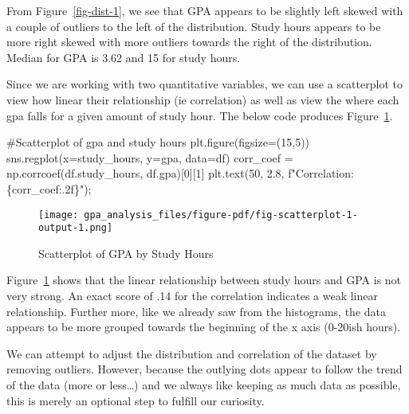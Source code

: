 \documentclass[
  letterpaper,
  DIV=11,
  numbers=noendperiod]{scrreprt}
\newenvironment{Shaded}{\begin{snugshade}}{\end{snugshade}}
\newcommand{\CommentTok}[1]{\textcolor[rgb]{0.37,0.37,0.37}{#1}}
\newcommand{\DecValTok}[1]{\textcolor[rgb]{0.68,0.00,0.00}{#1}}
\newcommand{\FloatTok}[1]{\textcolor[rgb]{0.68,0.00,0.00}{#1}}
\newcommand{\NormalTok}[1]{\textcolor[rgb]{0.00,0.23,0.31}{#1}}
\newcommand{\OperatorTok}[1]{\textcolor[rgb]{0.37,0.37,0.37}{#1}}
\newcommand{\SpecialCharTok}[1]{\textcolor[rgb]{0.37,0.37,0.37}{#1}}
\newcommand{\SpecialStringTok}[1]{\textcolor[rgb]{0.13,0.47,0.30}{#1}}
\newcommand{\StringTok}[1]{\textcolor[rgb]{0.13,0.47,0.30}{#1}}
\begin{document}
From Figure~\ref{fig-dist-1}, we see that GPA appears to be slightly
left skewed with a couple of outliers to the left of the distribution.
Study hours appears to be more right skewed with more outliers towards
the right of the distribution. Median for GPA is 3.62 and 15 for study
hours.

Since we are working with two quantitative variables, we can use a
scatterplot to view how linear their relationship (ie correlation) as
well as view the where each gpa falls for a given amount of study hour.
The below code produces Figure~\ref{fig-scatterplot-1}.

\begin{Shaded}
\begin{Highlighting}[]
\CommentTok{\#Scatterplot of gpa and study hours}
\NormalTok{plt.figure(figsize}\OperatorTok{=}\NormalTok{(}\DecValTok{15}\NormalTok{,}\DecValTok{5}\NormalTok{))}
\NormalTok{sns.regplot(x}\OperatorTok{=}\StringTok{\textquotesingle{}study\_hours\textquotesingle{}}\NormalTok{, y}\OperatorTok{=}\StringTok{\textquotesingle{}gpa\textquotesingle{}}\NormalTok{, data}\OperatorTok{=}\NormalTok{df)}
\NormalTok{corr\_coef }\OperatorTok{=}\NormalTok{ np.corrcoef(df.study\_hours, df.gpa)[}\DecValTok{0}\NormalTok{][}\DecValTok{1}\NormalTok{]}
\NormalTok{plt.text(}\DecValTok{50}\NormalTok{, }\FloatTok{2.8}\NormalTok{, }\SpecialStringTok{f"Correlation: }\SpecialCharTok{\{}\NormalTok{corr\_coef}\SpecialCharTok{:.2f\}}\SpecialStringTok{"}\NormalTok{)}\OperatorTok{;}
\end{Highlighting}
\end{Shaded}

\begin{figure}[H]

{\centering \texttt{[image: gpa\_analysis\_files/figure-pdf/fig-scatterplot-1-output-1.png]}

}

\caption{\label{fig-scatterplot-1}Scatterplot of GPA by Study Hours}

\end{figure}

Figure~\ref{fig-scatterplot-1} shows that the linear relationship
between study hours and GPA is not very strong. An exact score of .14
for the correlation indicates a weak linear relationship. Further more,
like we already saw from the histograms, the data appears to be more
grouped towards the beginning of the x axis (0-20ish hours).

We can attempt to adjust the distribution and correlation of the dataset
by removing outliers. However, because the outlying dots appear to
follow the trend of the data (more or less\ldots) and we always like
keeping as much data as possible, this is merely an optional step to
fulfill our curiosity.
\end{document}
